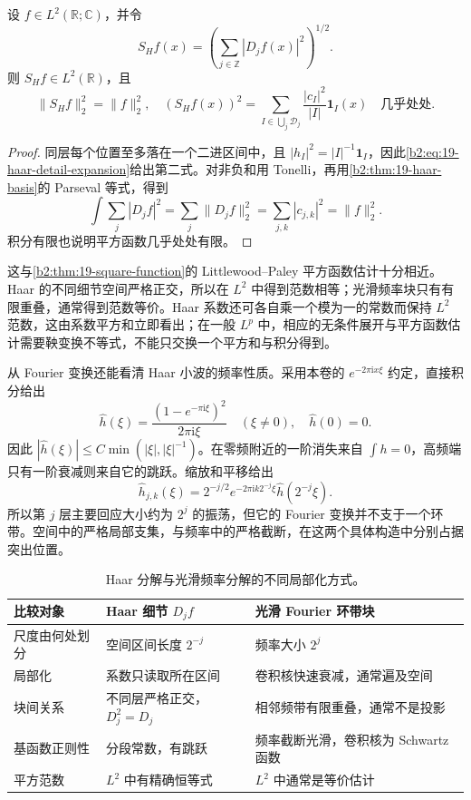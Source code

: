 \begin{proposition}\label{b2:prop:19-haar-square}
设 \(f\in L^2(\mathbb R;\mathbb C)\)，并令
\[
 S_{\!H}f(x)=\left(\sum_{j\in\mathbb Z}|D_jf(x)|^2\right)^{1/2}.
\]
则 \(S_{\!H}f\in L^2(\mathbb R)\)，且
\begin{equation}\label{b2:eq:19-haar-square}
 \|S_{\!H}f\|_2^2=\|f\|_2^2,
 \quad
 (S_{\!H}f(x))^2
 =\sum_{I\in\bigcup_j\mathcal D_j}
   \frac{|c_I|^2}{|I|}\mathbf1_I(x)
 \quad\text{几乎处处}.
\end{equation}
\end{proposition}
\begin{proof}
同层每个位置至多落在一个二进区间中，且 \(|h_I|^2=|I|^{-1}\mathbf1_I\)，因此\eqref{b2:eq:19-haar-detail-expansion}给出第二式。对非负和用 Tonelli，再用\cref{b2:thm:19-haar-basis}的 Parseval 等式，得到
\[
 \int\sum_j|D_jf|^2=\sum_j\|D_jf\|_2^2
 =\sum_{j,k}|c_{j,k}|^2=\|f\|_2^2.
\]
积分有限也说明平方函数几乎处处有限。
\end{proof}

这与\cref{b2:thm:19-square-function}的 Littlewood--Paley 平方函数估计十分相近。Haar 的不同细节空间严格正交，所以在 \(L^2\) 中得到范数相等；光滑频率块只有有限重叠，通常得到范数等价。Haar 系数还可各自乘一个模为一的常数而保持 \(L^2\) 范数，这由系数平方和立即看出；在一般 \(L^p\) 中，相应的无条件展开与平方函数估计需要鞅变换不等式，不能只交换一个平方和与积分得到。

从 Fourier 变换还能看清 Haar 小波的频率性质。采用本卷的 \(e^{-2\pi\mathrm i x\xi}\) 约定，直接积分给出
\begin{equation}\label{b2:eq:19-haar-fourier}
 \widehat h(\xi)
 =\frac{(1-e^{-\pi\mathrm i\xi})^2}{2\pi\mathrm i\xi}
 \quad(\xi\ne0),
 \quad \widehat h(0)=0.
\end{equation}
因此 \(|\widehat h(\xi)|\leq C\min(|\xi|,|\xi|^{-1})\)。在零频附近的一阶消失来自 \(\int h=0\)，高频端只有一阶衰减则来自它的跳跃。缩放和平移给出
\[
 \widehat h_{j,k}(\xi)
 =2^{-j/2}e^{-2\pi\mathrm i k2^{-j}\xi}
     \widehat h(2^{-j}\xi).
\]
所以第 \(j\) 层主要回应大小约为 \(2^j\) 的振荡，但它的 Fourier 变换并不支于一个环带。空间中的严格局部支集，与频率中的严格截断，在这两个具体构造中分别占据突出位置。

\begin{table}[htbp]
\centering
\small
\begin{tabular}{p{}p{}p{}}
\toprule
比较对象&Haar 细节 \(D_jf\)&光滑 Fourier 环带块\\
\midrule
尺度由何处划分&空间区间长度 \(2^{-j}\)&频率大小 \(2^j\)\\
局部化&系数只读取所在区间&卷积核快速衰减，通常遍及空间\\
块间关系&不同层严格正交，\(D_j^2=D_j\)&相邻频带有限重叠，通常不是投影\\
基函数正则性&分段常数，有跳跃&频率截断光滑，卷积核为 Schwartz 函数\\
平方范数&\(L^2\) 中有精确恒等式&\(L^2\) 中通常是等价估计\\
\bottomrule
\end{tabular}
\caption[Haar 分解与光滑频率分解]{Haar 分解与光滑频率分解的不同局部化方式。}
\label{b2:tab:19-haar-fourier-comparison}
\end{table}

